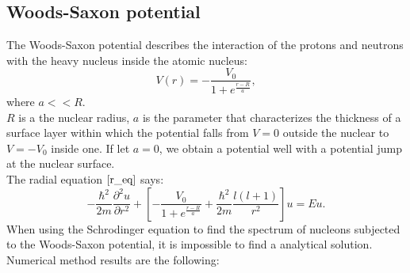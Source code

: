 \documentclass[a4paper, 14pt]{article}
\begin{document}
\subsection{Woods-Saxon potential}
The Woods-Saxon potential describes the interaction of the protons and neutrons with the heavy nucleus inside the atomic nucleus:
\begin{equation}
    V(r) = -\frac{V_0}{1+e^\frac{r-R}{a}},
\end{equation}
where $a<<R.$\\ 
$R$ is a the nuclear radius, $a$ is the parameter that characterizes the thickness of a surface layer within which the potential falls from $V=0$ outside the nuclear to  $V = -V_0$ inside one. If let $a=0$, we obtain a potential well with a potential jump at the nuclear surface. \\
The radial equation $\eqref{r_eq}$  says:
$$-\frac{\hbar^2}{2m}\frac{\partial^2 u}{\partial r^2}+[-\frac{V_0}{1+e^\frac{r-R}{a}}+\frac{\hbar^2}{2m}\frac{l(l+1)}{r^2}]u = Eu.$$
When using the Schrodinger equation to find the spectrum of nucleons subjected to the Woods-Saxon potential, it is impossible to find a analytical solution. Numerical method results are the following:
\end{document}
